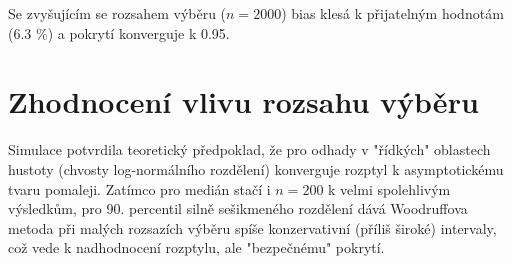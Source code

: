 Se zvyšujícím se rozsahem výběru ($n=2000$) bias klesá k přijatelným hodnotám (6.3 \%) a pokrytí konverguje k 0.95.

\section{Zhodnocení vlivu rozsahu výběru}

Simulace potvrdila teoretický předpoklad, že pro odhady v "řídkých" oblastech hustoty (chvosty log-normálního rozdělení) konverguje rozptyl k asymptotickému tvaru pomaleji. 
Zatímco pro medián stačí i $n=200$ k velmi spolehlivým výsledkům, pro 90. percentil silně sešikmeného rozdělení dává Woodruffova metoda při malých rozsazích výběru spíše konzervativní (příliš široké) intervaly, což vede k nadhodnocení rozptylu, ale "bezpečnému" pokrytí.
